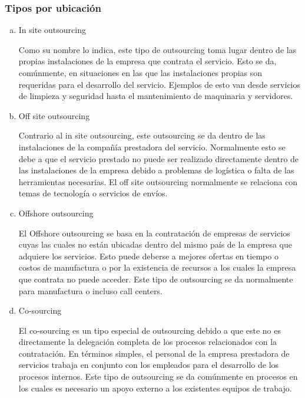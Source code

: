 \documentclass[10pt]{article}
\begin{document}
        \subsubsection{Tipos por ubicación}
    
        \begin{enumerate}[a)]
            \item In site outsourcing
            
            Como su nombre lo indica, este tipo de outsourcing toma lugar dentro de las propias instalaciones de la empresa que contrata el servicio. Esto se da, comúnmente, en situaciones en las que las instalaciones propias son requeridas para el desarrollo del servicio. Ejemplos de esto van desde servicios de limpieza y seguridad hasta el mantenimiento de maquinaria y servidores.

            \item Off site outsourcing
            
            Contrario al in site outsourcing, este outsourcing se da dentro de las instalaciones de la compañía prestadora del servicio. Normalmente esto se debe a que el servicio prestado no puede ser realizado directamente dentro de las instalaciones de la empresa debido a problemas de logística o falta de las herramientas necesarias. El off site outsourcing normalmente se relaciona con temas de tecnología o servicios de envíos.

            \item Offshore outsourcing
            
            El Offshore outsourcing se basa en la contratación de empresas de servicios cuyas las cuales no están ubicadas dentro del mismo país de la empresa que adquiere los servicios. Esto puede deberse a mejores ofertas en tiempo o costos de manufactura o por la existencia de recursos a los cuales la empresa que contrata no puede acceder. Este tipo de outsourcing se da normalmente para manufactura o incluso call centers.
            
            \item Co-sourcing 
            
            El co-sourcing es un tipo especial de outsourcing debido a que este no es directamente la delegación completa de los procesos relacionados con la contratación. En términos simples, el personal de la empresa prestadora de servicios trabaja en conjunto con los empleados para el desarrollo de los procesos internos. Este tipo de outsourcing se da comúnmente en procesos en los cuales es necesario un apoyo externo a los existentes equipos de trabajo. \cite{ref:journal}

        \end{enumerate}
\end{document}
